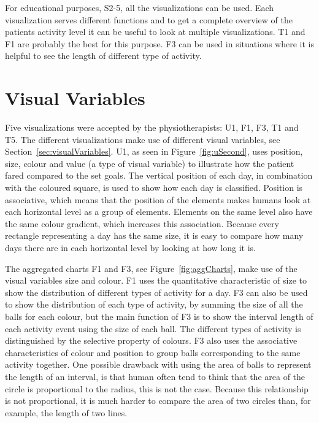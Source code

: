 For educational purposes, S2-5, all the visualizations can be used. Each visualization serves different functions and to get a complete overview of the patients activity level it can be useful to look at multiple visualizations. T1 and F1 are probably the best for this purpose. F3 can be used in situations where it is helpful to see the length of different type of activity.

\section{Visual Variables}
Five visualizations were accepted by the physiotherapists: U1, F1, F3, T1 and T5. The different visualizations make use of different visual variables, see Section~\ref{sec:visualVariables}. U1, as seen in Figure~\ref{fig:uSecond}, uses position, size, colour and value (a type of visual variable) to illustrate how the patient fared compared to the set goals. The vertical position of each day, in combination with the coloured square, is used to show how each day is classified. Position is associative, which means that the position of the elements makes humans look at each horizontal level as a group of elements. Elements on the same level also have the same colour gradient, which increases this association. Because every rectangle representing a day has the same size, it is easy to compare how many days there are in each horizontal level by looking at how long it is. 

The aggregated charts F1 and F3, see Figure~\ref{fig:aggCharts}, make use of the visual variables size and colour. F1 uses the quantitative characteristic of size to show the distribution of different types of activity for a day. F3 can also be used to show the distribution of each type of activity, by summing the size of all the balls for each colour, but the main function of F3 is to show the interval length of each activity event using the size of each ball. The different types of activity is distinguished by the selective property of colours. F3 also uses the associative characteristics of colour and position to group balls corresponding to the same activity together. One possible drawback with using the area of balls to represent the length of an interval, is that human often tend to think that the area of the circle is proportional to the radius, this is not the case. Because this relationship is not proportional, it is much harder to compare the area of two circles than, for example, the length of two lines.

